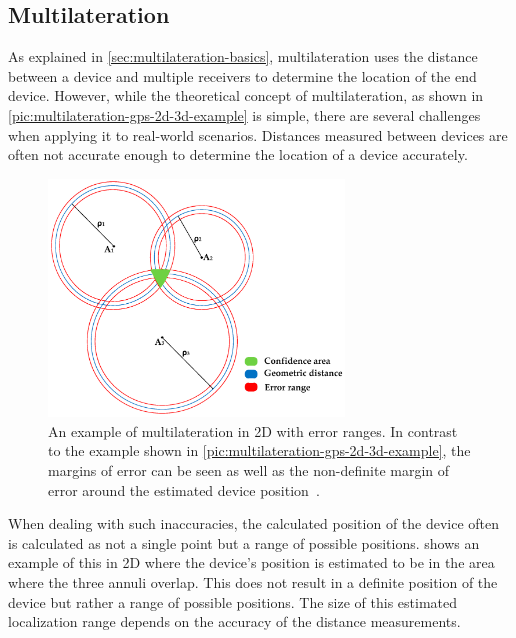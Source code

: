 \subsection{Multilateration}\label{sec:lorawan-multilateration}

As explained in \cref{sec:multilateration-basics}, multilateration uses the distance between a device and multiple receivers to determine the location of the end device.
However, while the theoretical concept of multilateration, as shown in \cref{pic:multilateration-gps-2d-3d-example} is simple, there are several challenges when applying it to real-world scenarios.
Distances measured between devices are often not accurate enough to determine the location of a device accurately.

\begin{figure}[htbp]
    \centering
    \includegraphics[width=0.7\textwidth]{pictures/multilateration/multilateration_error_ranges.png}
    \caption{
        An example of multilateration in 2D with error ranges.
        In contrast to the example shown in \cref{pic:multilateration-gps-2d-3d-example}, the margins of error can be seen as well as the non-definite margin of error around the estimated device position~\protect\cite{kapoor_novel_2016}.
    }\label{pic:multilateration-with-error-ranges-example}
\end{figure}

When dealing with such inaccuracies, the calculated position of the device often is calculated as not a single point but a range of possible positions.
 shows an example of this in 2D where the device's position is estimated to be in the area where the three annuli overlap.
This does not result in a definite position of the device but rather a range of possible positions.
The size of this estimated localization range depends on the accuracy of the distance measurements.

